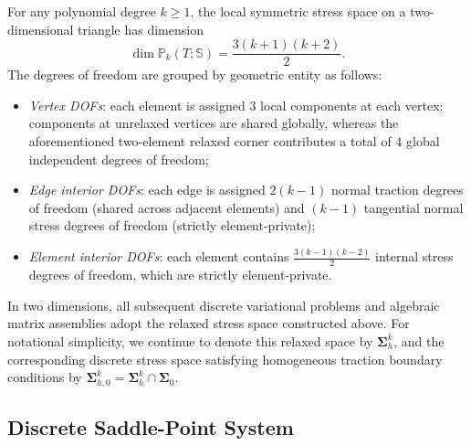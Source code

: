 For any polynomial degree $k \ge 1$, the local symmetric stress space on a two-dimensional triangle has dimension
\[
\dim \mathbb{P}_k(T;\mathbb{S}) = \frac{3(k+1)(k+2)}{2}.
\]
The degrees of freedom are grouped by geometric entity as follows:
\begin{itemize}
\item \emph{Vertex DOFs}: each element is assigned 3 local components at each vertex; components at unrelaxed vertices are shared globally, whereas the aforementioned two-element relaxed corner contributes a total of 4 global independent degrees of freedom;
\item \emph{Edge interior DOFs}: each edge is assigned $2(k-1)$ normal traction degrees of freedom (shared across adjacent elements) and $(k-1)$ tangential normal stress degrees of freedom (strictly element-private);
\item \emph{Element interior DOFs}: each element contains $\frac{3(k-1)(k-2)}{2}$ internal stress degrees of freedom, which are strictly element-private.
\end{itemize}

In two dimensions, all subsequent discrete variational problems and algebraic matrix assemblies adopt the relaxed stress space constructed above. For notational simplicity, we continue to denote this relaxed space by $\boldsymbol{\Sigma}_h^k$, and the corresponding discrete stress space satisfying homogeneous traction boundary conditions by $\boldsymbol{\Sigma}_{h,0}^k = \boldsymbol{\Sigma}_h^k \cap \boldsymbol{\Sigma}_0$.

\subsection{Discrete Saddle-Point System}
\label{subsec:saddle_point_system}

